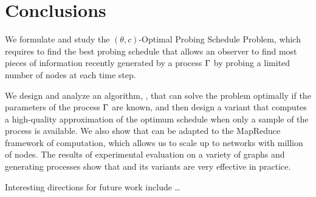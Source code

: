 \section{Conclusions}\label{sec:concl}

We formulate and study the $(\theta,c)$-Optimal Probing Schedule Problem,
which requires to find the best probing schedule that allows an observer to find
most pieces of information recently generated by a process $\Gamma$ by probing a
limited number of nodes at each time step.

We design and analyze an algorithm, \algoname, that can solve the problem
optimally if the parameters of the process $\Gamma$ are known, and then design a
variant that computes a high-quality approximation of the optimum schedule when
only a sample of the process is available. We also show that \algoname can be
adapted to the MapReduce framework of computation, which allows us to scale up
to networks with million of nodes. The results of experimental evaluation on a
variety of graphs and generating processes show that \algoname and its variants
are very effective in practice.

Interesting directions for future work include \ldots
{}
